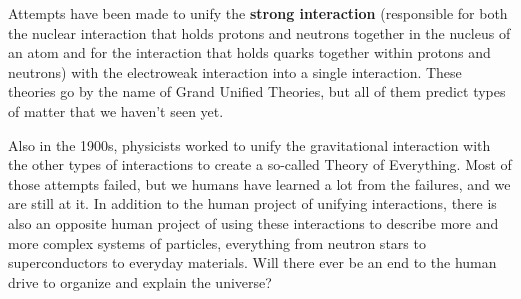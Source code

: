 \documentclass[12pt,twocolumn]{article}
\begin{document}
Attempts have been made to unify the \textbf{strong interaction} (responsible for both the nuclear interaction that holds protons and neutrons together in the nucleus of an atom and for the interaction that holds quarks together within protons and neutrons) with the electroweak interaction into a single interaction.  These theories go by the name of Grand Unified Theories, but all of them predict types of matter that we haven't seen yet.

Also in the 1900s, physicists worked to unify the gravitational interaction with the other types of interactions to create a so-called Theory of Everything.  Most of those attempts failed, but we humans have learned a lot from the failures, and we are still at it.  In addition to the human project of unifying interactions, there is also an opposite human project of using these interactions to describe more and more complex systems of particles, everything from neutron stars to superconductors to everyday materials.  Will there ever be an end to the human drive to organize and explain the universe?
\end{document}
